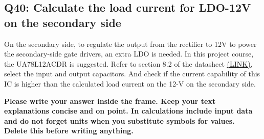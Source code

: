 \documentclass{PELsmallreport}
\begin{document}
\subsection{Q40: Calculate the load current for LDO-12V on the secondary side}
On the secondary side, to regulate the output from the rectifier to 12V to power the secondary-side gate drivers, an extra LDO is needed. In this project course, the UA78L12ACDR is suggested. Refer to section 8.2 of the datasheet \href{https://www.ti.com/lit/ds/symlink/ua78l.pdf}{(LINK)}, select the input and output capacitors. And check if the current capability of this IC is higher than the calculated load current on the 12-V on the secondary side.\\ 

\begin{framed}
	\vspace{2em}
	\textbf{Please write your answer inside the frame. Keep your text explanations concise and on point. In calculations include input data and do not forget units when you substitute symbols for values. \\ Delete this before writing anything.}
	\vspace{2em}
\end{framed}
 \quad  {} \quad  \hfill{}

\end{document}
